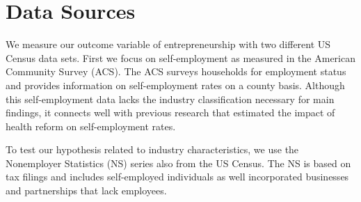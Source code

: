 \documentclass[12pt]{article}
\begin{document}
\section{Data Sources}
\label{sec:data}


We measure our outcome variable of entrepreneurship with two different US Census data sets. First we focus on self-employment as measured in the American Community Survey (ACS). The ACS surveys households for employment status and provides information on self-employment rates on a county basis. Although this self-employment data lacks the industry classification necessary for main findings, it connects well with previous research that estimated the impact of health reform on self-employment rates. 

To test our hypothesis related to industry characteristics, we use the Nonemployer Statistics (NS) series also from the US Census. The NS is based on tax filings and includes self-employed individuals as well incorporated businesses and partnerships that lack employees. 

\begin{comment}

Our second source of data is the Census Country Business Patterns (CBP). The CBP is an annual series based on the Census Business Register, a dataset of US firms that is continuously updated using multiple methods including surveys and tax reporting. The CBP provides country level information on for example the industry, sales and employee count of establishments. It excludes businesses with no paid employees. As shown in Figure \ref{fig:firm_est}, establishments closely track firms. Although we are primarily interested in new firm creation, the census does not publicly provide firm level data at the industry level per county. We use establishments of 1 to 4 employees (small establishments) as a proxy for entrepreneurial firms. 

\begin{figure}[H]
	\centering
	\texttt{[image: resources/firm\_est\_MA.eps]}
	\caption{Number of firms and establishments in Massachusetts with 1 to 4 employees}
	\label{fig:firm_est}
\end{figure}

Our third source of data is the Nonemployer Statistics series. The NS is based on tax filings. It includes self-employed individuals as well incorporated businesses and partnerships that lack employees. 

\end{comment}
\end{document}
